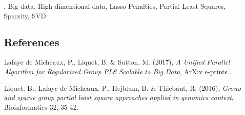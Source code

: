 \documentclass[12pt]{article}
\begin{document}
\vskip 2mm

.
Big data, High dimensional data, Lasso Penalties, Partial Least Squares, Sparsity, SVD


%        
%
%        

\vspace{-0.5cm}
\subsection*{References}

\begin{description}
{\footnotesize
\item Lafaye de Micheaux, P., Liquet, B. \& Sutton, M. (2017), \textit{A Unified Parallel Algorithm for
Regularized Group PLS Scalable to Big Data}, ArXiv e-prints .
\vspace{-0.2cm}

\item Liquet, B., Lafaye de Micheaux, P., Hejblum, B. \& Thiebaut, R. (2016), \textit{Group and
sparse group partial least square approaches applied in genomics context}, Bioinformatics
32, 35-42.
}

\end{description}
\end{document}
